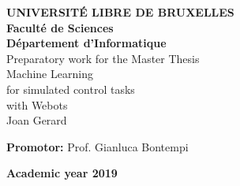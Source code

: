 \begin{titlepage}
    \begin{center}
        
        \normalsize
        \textbf{UNIVERSITÉ LIBRE DE BRUXELLES}\\
        \small
        \textbf{Faculté de Sciences}\\
        \textbf{Département d'Informatique}\\
        
        \vspace{4.0cm}
        \huge
        Preparatory work for the Master Thesis\\
        \vspace{0.5cm}
        \Huge
        Machine Learning\\
        for simulated control tasks\\
        with Webots\\
        
        \vspace{0.5cm}
        \normalsize
        Joan Gerard
        
        \vspace{7cm}
        \small
        \textbf{Promotor:} Prof. Gianluca Bontempi
        
        \vspace{4cm}
        \footnotesize
         \textbf{Academic year 2019}
        
    \end{center}
\end{titlepage}